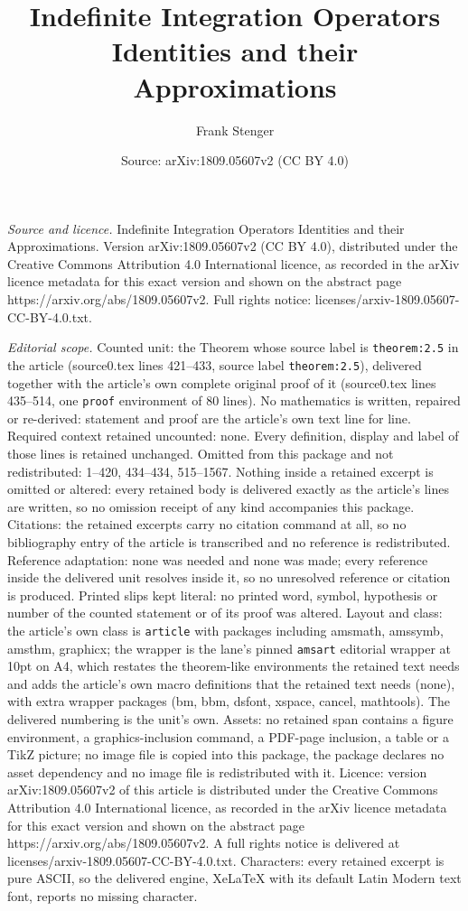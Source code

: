 \documentclass[10pt,a4paper]{amsart}
\title[Indefinite Integration Operators Identities and their Approx]{Indefinite Integration Operators Identities and their Approximations}
\author{Frank Stenger}
\date{Source: arXiv:1809.05607v2 (CC BY 4.0)}
\begin{document}
\maketitle

\noindent\emph{Source and licence.} Indefinite Integration Operators Identities and their Approximations. Version arXiv:1809.05607v2 (CC BY 4.0), distributed under the Creative Commons Attribution 4.0 International licence, as recorded in the arXiv licence metadata for this exact version and shown on the abstract page https://arxiv.org/abs/1809.05607v2. Full rights notice: licenses/arxiv-1809.05607-CC-BY-4.0.txt.\par\smallskip

\noindent\textit{Editorial scope.} Counted unit: the Theorem whose source label is \texttt{theorem:2.5} in the article (source0.tex lines 421--433, source label \texttt{theorem:2.5}), delivered together with the article's own complete original proof of it (source0.tex lines 435--514, one \texttt{proof} environment of 80 lines). No mathematics is written, repaired or re-derived: statement and proof are the article's own text line for line. Required context retained uncounted: none. Every definition, display and label of those lines is retained unchanged. Omitted from this package and not redistributed: 1--420, 434--434, 515--1567. Nothing inside a retained excerpt is omitted or altered: every retained body is delivered exactly as the article's lines are written, so no omission receipt of any kind accompanies this package. Citations: the retained excerpts carry no citation command at all, so no bibliography entry of the article is transcribed and no reference is redistributed. Reference adaptation: none was needed and none was made; every reference inside the delivered unit resolves inside it, so no unresolved reference or citation is produced. Printed slips kept literal: no printed word, symbol, hypothesis or number of the counted statement or of its proof was altered. Layout and class: the article's own class is \texttt{article} with packages including amsmath, amssymb, amsthm, graphicx; the wrapper is the lane's pinned \texttt{amsart} editorial wrapper at 10pt on A4, which restates the theorem-like environments the retained text needs and adds the article's own macro definitions that the retained text needs (none), with extra wrapper packages (bm, bbm, dsfont, xspace, cancel, mathtools). The delivered numbering is the unit's own. Assets: no retained span contains a figure environment, a graphics-inclusion command, a PDF-page inclusion, a table or a TikZ picture; no image file is copied into this package, the package declares no asset dependency and no image file is redistributed with it. Licence: version arXiv:1809.05607v2 of this article is distributed under the Creative Commons Attribution 4.0 International licence, as recorded in the arXiv licence metadata for this exact version and shown on the abstract page https://arxiv.org/abs/1809.05607v2. A full rights notice is delivered at licenses/arxiv-1809.05607-CC-BY-4.0.txt. Characters: every retained excerpt is pure ASCII, so the delivered engine, XeLaTeX with its default Latin Modern text font, reports no missing character.
\end{document}
